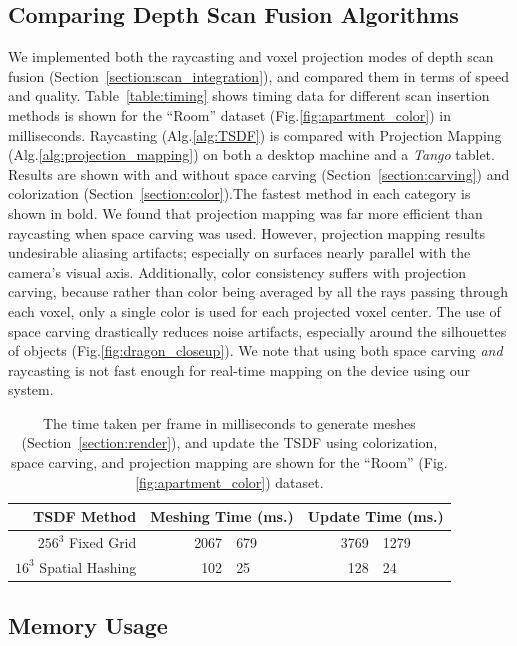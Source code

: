 \documentclass[conference]{IEEEtran}
\newcommand{\sref}[1]{Section~\ref{#1}}
\newcommand{\figref}[1]{Fig.\ref{#1}}
\newcommand{\tabref}[1]{Table~\ref{#1}}
\newcommand{\algoref}[1]{Alg.\ref{#1}}
\newcommand{\Tango}{\textit{Tango} }
\begin{document}
\subsection{Comparing Depth Scan Fusion Algorithms} 
\label{section:scan_compare}
We implemented both the raycasting and voxel projection modes of depth scan
fusion (\sref{section:scan_integration}), and compared them in terms of speed
and quality. \tabref{table:timing} shows timing data for different scan
insertion methods is shown for the ``Room'' dataset
(\figref{fig:apartment_color}) in milliseconds. Raycasting (\algoref{alg:TSDF})
is compared with Projection Mapping (\algoref{alg:projection_mapping}) on both a
desktop machine and a \Tango tablet. Results are shown with and without
space carving (\sref{section:carving}) and colorization
(\sref{section:color}).The fastest method in each category is shown in bold. We
found that projection mapping was far more efficient than raycasting when space
carving was used. However, projection mapping results undesirable aliasing
artifacts; especially on surfaces nearly parallel with the camera's visual axis.
Additionally, color consistency suffers with projection carving, because rather
than color being averaged by all the rays passing through each voxel, only a
single color is used for each projected voxel center. The use of space carving
drastically reduces noise artifacts, especially around the silhouettes of
objects (\figref{fig:dragon_closeup}). We note that using both space carving
\emph{and} raycasting is not fast enough for real-time mapping on the device
using our system.

\begin{table}
\centering
\begin{tabular} {rr@{ $\pm$ }lr@{ $\pm$ }l} \toprule
TSDF Method & \multicolumn{2}{c}{Meshing Time (ms.)} & \multicolumn{2}{c}{Update Time (ms.)}\\ 
\midrule
$256^3$ Fixed Grid     & 2067 & 679 & 3769 & 1279  \\
$16^3$ Spatial Hashing & 102  &  25 & 128 &   24   \\ 
\bottomrule
\end{tabular}
\caption{The time taken per frame in milliseconds to generate meshes
(\sref{section:render}), and update the TSDF using colorization, space carving, and projection mapping
are shown for the ``Room'' (\figref{fig:apartment_color}) dataset.}
\label{table:meshingtimes}
\end{table}

\subsection{Memory Usage}
\label{section:memory}
\end{document}
